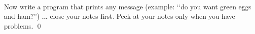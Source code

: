 \\
Now write a program that prints any message 
(example: \lq\lq do you want green eggs and ham?'') ... 
close your notes first. Peek at your notes only when you have problems.
\qed
